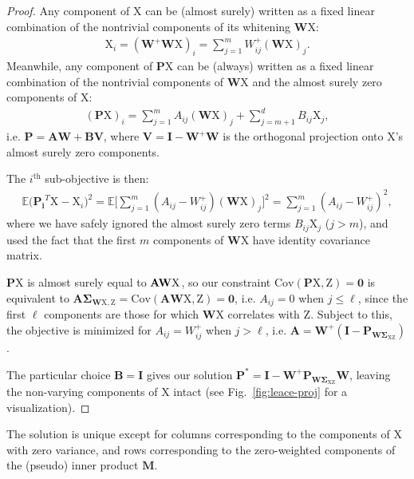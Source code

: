 \documentclass{article}
\theoremstyle{plain}
\theoremstyle{remark}
\newcommand{\sxz}{\mathbf \Sigma_{\rv X \rv Z}}
\newcommand{\swxz}{\mathbf \Sigma_{\mathbf{W} \rv X, \rv Z}}
\newcommand{\pwxz}{\mathbf P_{\mathbf{W}\sxz}}
\newcommand{\E}{\mathbb E}
\theoremstyle{plain}
\theoremstyle{TheoremNum}
\newcommand{\rv}[1]{{\mathrm{#1}}}
\begin{document}
\begin{proof}
    Any component of $\rv X$ can be (almost surely) written as a fixed linear combination of the nontrivial components of its whitening $\mathbf{W}\rv X$:
    \begin{align*}
        \rv X_i = (\mathbf{W}^+\mathbf{W}\rv X)_i = \sum_{j=1}^m W_{ij}^+ (\mathbf{W}\rv X)_j.\tag{almost surely}
    \end{align*}
    Meanwhile, any component of $\mathbf{P}\rv X$ can be (always) written as a fixed linear combination of the nontrivial components of $\mathbf{W}\rv X$ and the almost surely zero components of $\rv X$:
    \begin{align*}
        (\mathbf{P} \rv X)_i = \sum_{j=1}^m A_{ij} (\mathbf{W}\rv X)_j + \sum_{j=m+1}^d B_{ij} \rv X_j,
    \end{align*}
    i.e. $\mathbf{P} = \mathbf {AW} + \mathbf {BV}$, where $\mathbf{V} = \mathbf{I} - \mathbf{W}^+\mathbf{W}$ is the orthogonal projection onto $\rv X$'s almost surely zero components.

    The $i^\text{th}$ sub-objective is then:
    \begin{align*}
        \E \big( \mathbf{P_i}^T\rv X - \rv X_i \big)^2 = \E \Bigg[ \sum_{j=1}^m (A_{ij} - W_{ij}^+) (\mathbf{W}\rv X)_j \Bigg]^2
        = \sum_{j=1}^m (A_{ij} - W_{ij}^+)^2,
    \end{align*}
    where we have safely ignored the almost surely zero terms $B_{ij} \rv X_j$ ($j > m$), and used the fact that the first $m$ components of $\mathbf{W}\rv X$ have identity covariance matrix.

    $\mathbf P \rv X$ is almost surely equal to $\bf {AW} \rv X$, so our constraint $\mathrm{Cov}(\mathbf{P}\rv X, \rv Z) = \mathbf{0}$ is equivalent to $\mathbf{A}\swxz = \mathrm{Cov}(\mathbf{AW}\rv X, \rv Z) = \mathbf 0$, i.e. $A_{ij} = 0$ when $j \le \ell$, since the first $\ell$ components are those for which $\mathbf W \rv X$ correlates with $\rv Z$. Subject to this, the objective is minimized for $A_{ij} = W_{ij}^+$ when $j > \ell$, i.e. $\mathbf A = \mathbf{W}^+ (\mathbf I - \pwxz)$.
        
    The particular choice $\mathbf{B} = \mathbf{I}$ gives our solution $\mathbf{P^*} = \mathbf{I} - \mathbf{W}^+ \pwxz\mathbf{W}$, leaving the non-varying components of $\rv X$ intact (see Fig.~\ref{fig:leace-proj} for a visualization).
\end{proof}

The solution is unique except for columns corresponding to the components of $\rv X$ with zero variance, and rows corresponding to the zero-weighted components of the (pseudo) inner product $\mathbf{M}$.
\end{document}
